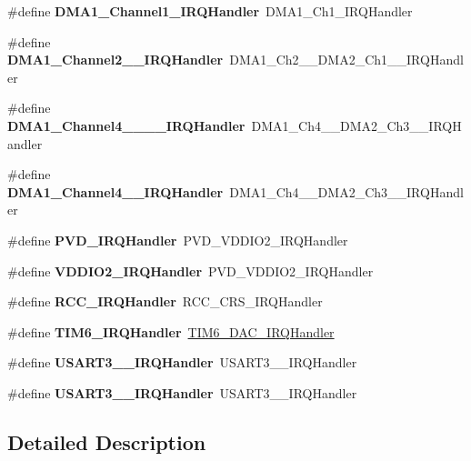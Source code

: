 \begin{DoxyCompactItemize}
\mbox{\label{group__stm32f091xc_gae5bb73ee2d8d954cc9d44dd4cb86cc8d}} 
\#define {\bfseries D\+M\+A1\+\_\+\+Channel1\+\_\+\+I\+R\+Q\+Handler}~D\+M\+A1\+\_\+\+Ch1\+\_\+\+I\+R\+Q\+Handler
\item 
\mbox{\label{group__stm32f091xc_ga0f84b0e43f521b06fbe4d4330047d552}} 
\#define {\bfseries D\+M\+A1\+\_\+\+Channel2\+\_\+\_\+\+I\+R\+Q\+Handler}~D\+M\+A1\+\_\+\+Ch2\+\_\+\_\+\+D\+M\+A2\+\_\+\+Ch1\+\_\+\_\+\+I\+R\+Q\+Handler
\item 
\mbox{\label{group__stm32f091xc_gae3db46ad17e9f800e0f88b489eed522d}} 
\#define {\bfseries D\+M\+A1\+\_\+\+Channel4\+\_\+\_\+\_\+\_\+\+I\+R\+Q\+Handler}~D\+M\+A1\+\_\+\+Ch4\+\_\+\_\+\+D\+M\+A2\+\_\+\+Ch3\+\_\+\_\+\+I\+R\+Q\+Handler
\item 
\mbox{\label{group__stm32f091xc_gac0e40c40e17f156c06448e594bf54eaf}} 
\#define {\bfseries D\+M\+A1\+\_\+\+Channel4\+\_\+\_\+\+I\+R\+Q\+Handler}~D\+M\+A1\+\_\+\+Ch4\+\_\+\_\+\+D\+M\+A2\+\_\+\+Ch3\+\_\+\_\+\+I\+R\+Q\+Handler
\item 
\mbox{\label{group__stm32f091xc_ga045476dfaec8c84f5e16b06b937c0c18}} 
\#define {\bfseries P\+V\+D\+\_\+\+I\+R\+Q\+Handler}~P\+V\+D\+\_\+\+V\+D\+D\+I\+O2\+\_\+\+I\+R\+Q\+Handler
\item 
\mbox{\label{group__stm32f091xc_gac1854dcfbcf2950cee25063d73a5edb0}} 
\#define {\bfseries V\+D\+D\+I\+O2\+\_\+\+I\+R\+Q\+Handler}~P\+V\+D\+\_\+\+V\+D\+D\+I\+O2\+\_\+\+I\+R\+Q\+Handler
\item 
\mbox{\label{group__stm32f091xc_ga5a6d083fa78461da86a717b28973e009}} 
\#define {\bfseries R\+C\+C\+\_\+\+I\+R\+Q\+Handler}~R\+C\+C\+\_\+\+C\+R\+S\+\_\+\+I\+R\+Q\+Handler
\item 
\mbox{\label{group__stm32f091xc_gae30e35a563a952a284f3f54d7f164ccd}} 
\#define {\bfseries T\+I\+M6\+\_\+\+I\+R\+Q\+Handler}~\hyperlink{group___h_a_l___time_base___t_i_m_ga0839a45f331c4c067939b9c4533bbf4d}{T\+I\+M6\+\_\+\+D\+A\+C\+\_\+\+I\+R\+Q\+Handler}
\item 
\mbox{\label{group__stm32f091xc_gae05084e274a2e228d5ccf9423e5bce6e}} 
\#define {\bfseries U\+S\+A\+R\+T3\+\_\+\_\+\+I\+R\+Q\+Handler}~U\+S\+A\+R\+T3\+\_\+\_\+\+I\+R\+Q\+Handler
\item 
\mbox{\label{group__stm32f091xc_gaf04189172ff710986cd652a06e6f3f69}} 
\#define {\bfseries U\+S\+A\+R\+T3\+\_\+\_\+\+I\+R\+Q\+Handler}~U\+S\+A\+R\+T3\+\_\+\_\+\+I\+R\+Q\+Handler
\end{DoxyCompactItemize}


\subsection{Detailed Description}
